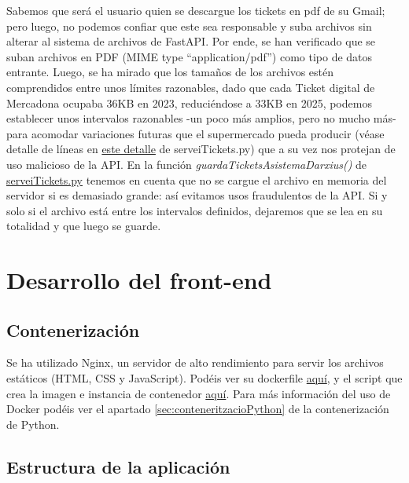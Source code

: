 \documentclass[a4paper,12pt]{report}
\begin{document}
	Sabemos que será el usuario quien se descargue los tickets en pdf de su Gmail; pero luego, no podemos confiar que este sea responsable y suba archivos sin alterar al sistema de archivos de FastAPI. Por ende, se han verificado que se suban archivos en PDF (MIME type ``application/pdf'') como tipo de datos entrante. Luego, se ha mirado que los tamaños de los archivos estén comprendidos entre unos límites razonables, dado que cada Ticket digital de Mercadona ocupaba 36KB en 2023, reduciéndose a 33KB en 2025, podemos establecer unos intervalos razonables -un poco más amplios, pero no mucho más- para acomodar variaciones futuras que el supermercado pueda producir (véase detalle de líneas en \href{https://github.com/blackcub3s/mercApp/blob/23594665639485c1bf9b7ba7e1904fe9785cf5ae/APP%20WEB/__FastAPI__/app/serveiTickets.py#L84-L85}{este detalle} de serveiTickets.py) que a su vez nos protejan de uso malicioso de la API. En la función \textit{guardaTicketsAsistemaDarxius()} de  \href{https://github.com/blackcub3s/mercApp/blob/main/APP%20WEB/__FastAPI__/app/serveiTickets.py}{serveiTickets.py} tenemos en cuenta que no se cargue el archivo en memoria del servidor si es demasiado grande: así evitamos usos fraudulentos de la API. Si y solo si el archivo está entre los intervalos definidos, dejaremos que se lea en su totalidad y que luego se guarde.
	
	
	
	\section{Desarrollo del front-end}
	
	\subsection{Contenerización}
	
	Se ha utilizado Nginx, un servidor de alto rendimiento para servir los archivos estáticos (HTML, CSS y JavaScript). Podéis ver su dockerfile \href{https://github.com/blackcub3s/mercApp/blob/main/APP%20WEB/__frontend__produccio__/Dockerfile}{aquí}, y el script que crea la imagen e instancia de contenedor \href{https://github.com/blackcub3s/mercApp/blob/main/APP%20WEB/__frontend__produccio__/creaImatge_i_arrancaContenidor.sh}{aquí}. Para más información del uso de Docker podéis ver el apartado \ref{sec:conteneritzacioPython} de la contenerización de Python.
	
	\subsection{Estructura de la aplicación}
	\label{sec:estructuraAplicacionFrontEnd}
	
\end{document}

